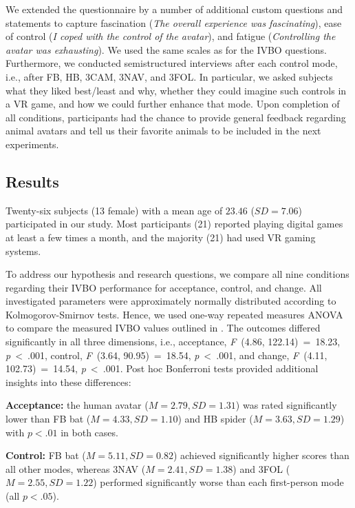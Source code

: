 We extended the questionnaire by a number of additional custom questions and statements to capture fascination (\textit{The overall experience was fascinating}), ease of control (\textit{I coped with the control of the avatar}), and fatigue (\textit{Controlling the avatar was exhausting}). We used the same scales as for the IVBO questions. Furthermore, we conducted semistructured interviews after each control mode, i.e., after FB, HB, 3CAM, 3NAV, and 3FOL. In particular, we asked subjects what they liked best/least and why, whether they could imagine such controls in a VR game, and how we could further enhance that mode. Upon completion of all conditions, participants had the chance to provide general feedback regarding animal avatars and tell us their favorite animals to be included in the next experiments.





\subsection{Results}

Twenty-six subjects (13 female) with a mean age of $23.46$ ($SD=7.06$) participated in our study. Most participants (21) reported playing digital games at least a few times a month, and the majority (21) had used VR gaming systems. 

To address our hypothesis and research questions, we compare all nine conditions regarding their IVBO performance for acceptance, control, and change. All investigated parameters were approximately normally distributed according to Kolmogorov-Smirnov tests. Hence, we used one-way repeated measures ANOVA to compare the measured IVBO  values outlined in . The outcomes differed significantly in all three dimensions, i.e., acceptance, \textit{F}~(4.86, 122.14)~=~18.23, \textit{p}~<~.001, control, \textit{F}~(3.64, 90.95)~=~18.54, \textit{p}~<~.001, and change, \textit{F}~(4.11, 102.73)~=~14.54, \textit{p}~<~.001. Post hoc Bonferroni tests provided additional insights into these differences:

\textbf{Acceptance:} the human avatar ($M = 2.79, SD = 1.31$) was rated significantly lower than FB bat ($M = 4.33, SD = 1.10$) and HB spider ($M = 3.63, SD = 1.29$) with $p < .01$ in both cases. 

\textbf{Control:} FB bat ($M = 5.11, SD = 0.82$) achieved significantly higher scores than all other modes, whereas 3NAV ($M = 2.41, SD = 1.38$) and 3FOL ($M = 2.55, SD = 1.22$) performed significantly worse than each first-person mode (all $p < .05$). 

